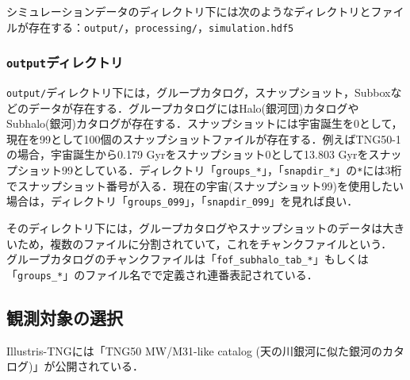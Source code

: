 シミュレーションデータのディレクトリ下には次のようなディレクトリとファイルが存在する：\texttt{output/}，\texttt{processing/}，\texttt{simulation.hdf5}

\subsubsection{\texttt{output}ディレクトリ}

\texttt{output/}ディレクトリ下には，グループカタログ，スナップショット，Subboxなどのデータが存在する．グループカタログにはHalo(銀河団)カタログやSubhalo(銀河)カタログが存在する．スナップショットには宇宙誕生を0として，現在を99として100個のスナップショットファイルが存在する．例えばTNG50-1の場合，宇宙誕生から0.179 Gyrをスナップショット0として13.803 Gyrをスナップショット99としている．ディレクトリ「\texttt{groups\_*}」，「\texttt{snapdir\_*}」の\texttt{*}には3桁でスナップショット番号が入る．現在の宇宙(スナップショット99)を使用したい場合は，ディレクトリ「\texttt{groups\_099}」，「\texttt{snapdir\_099}」を見れば良い．

そのディレクトリ下には，グループカタログやスナップショットのデータは大きいため，複数のファイルに分割されていて，これをチャンクファイルという． グループカタログのチャンクファイルは「\texttt{fof\_subhalo\_tab\_*}」もしくは「\texttt{groups\_*}」のファイル名でで定義され連番表記されている．

\subsection{観測対象の選択}

Illustris-TNGには「TNG50 MW/M31-like catalog (天の川銀河に似た銀河のカタログ)」が公開されている\citep{pillepich_milky_2023}．

%	
%	
%	
%	
